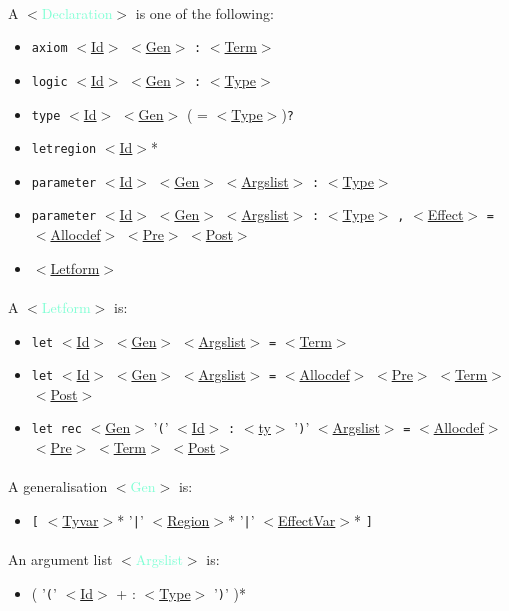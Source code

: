 \documentclass[a4paper]{scrreprt}
\newcommand{\cat}[1]{$<$\hyperref[#1]{#1}$>$}
\newcommand{\catdef}[1]{\label{#1}$<$\textcolor{Aquamarine}{#1}$>$}
\begin{document}
\paragraph{}
A \catdef{Declaration} is one of the following: 
\begin{itemize}
  \item {\tt axiom} \cat{Id} \cat{Gen} {\tt :} \cat{Term}
  \item {\tt logic} \cat{Id} \cat{Gen} {\tt :} \cat{Type}
  \item {\tt type} \cat{Id} \cat{Gen}  ( = \cat{Type}){\tt ?}
  \item {\tt letregion} \cat{Id}*
  \item {\tt parameter} \cat{Id} \cat{Gen} \cat{Argslist} {\tt :} \cat{Type}
  \item {\tt parameter} \cat{Id} \cat{Gen} \cat{Argslist} {\tt :} \cat{Type}
    {\tt ,} \cat{Effect} {\tt =} \cat{Allocdef} {\cat{Pre}} {\cat{Post}}
  \item \cat{Letform}
\end{itemize}

\paragraph{}
A \catdef{Letform} is:
\begin{itemize}
  \item {\tt let} \cat{Id} \cat{Gen} \cat{Argslist} {\tt =} \cat{Term}
  \item {\tt let} \cat{Id} \cat{Gen} \cat{Argslist} {\tt =} \cat{Allocdef} {\cat{Pre}} \cat{Term} {\cat{Post}}
  \item {\tt let rec} \cat{Gen} '{\tt (}' \cat{Id} {\tt :} \cat{ty} '{\tt )}'
    \cat{Argslist} {\tt =} \cat{Allocdef} {\cat{Pre}} \cat{Term} {\cat{Post}}
\end{itemize}

\paragraph{}
A generalisation \catdef{Gen} is:
\begin{itemize}
  \item {\tt [} \cat{Tyvar}* '{\tt |}' \cat{Region}* '{\tt |}' \cat{EffectVar}*
    {\tt ]}
\end{itemize}

\paragraph{}
An argument list \catdef{Argslist} is:
\begin{itemize}
  \item ( '{\tt (}' \cat{Id} + : \cat{Type} '{\tt )}' )*
\end{itemize}
\end{document}
